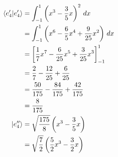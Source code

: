 \documentclass{article}
\begin{document}
\begin{align*}
  \braket{e_4' | e_4'} & = \int_{-1}^1 \left( x^3 - \frac{3}{5} x \right)^2 \,d x                      \\
                       & = \int_{-1}^1 \left( x^6 - \frac{6}{5} x^4 + \frac{9}{25} x^2 \right) \,d x   \\
                       & = \left[ \frac{1}{7} x^7 - \frac{6}{25} x^5 + \frac{3}{25} x^3 \right]_{-1}^1 \\
                       & = \frac{2}{7} - \frac{12}{25} + \frac{6}{25}                                  \\
                       & = \frac{50}{175} - \frac{84}{175} + \frac{42}{175}                            \\
                       & = \frac{8}{175}                                                               \\
  \ket{e_4''}          & = \sqrt{\frac{175}{8}} \left( x^3 - \frac{3}{5} x \right)                     \\
                       & = \sqrt{\frac{7}{2}} \left( \frac{5}{2} x^3 - \frac{3}{2} x \right)
\end{align*}

\subsection{}
\end{document}
